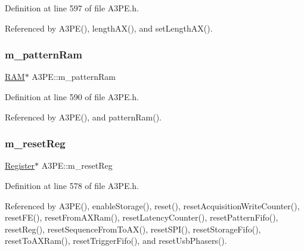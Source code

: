 Definition at line 597 of file A3\+P\+E.\+h.



Referenced by A3\+P\+E(), length\+A\+X(), and set\+Length\+A\+X().

\mbox{\label{classA3PE_a84d5deabbbf2d513144dd6a00390182e}} 
\subsubsection{\texorpdfstring{m\+\_\+pattern\+Ram}{m\_patternRam}}
{\footnotesize\ttfamily \hyperlink{classRAM}{R\+AM}$\ast$ A3\+P\+E\+::m\+\_\+pattern\+Ram\hspace{0.3cm}{\ttfamily [private]}}



Definition at line 590 of file A3\+P\+E.\+h.



Referenced by A3\+P\+E(), and pattern\+Ram().

\mbox{\label{classA3PE_ab4db5f00976e5095686f108c8febf702}} 
\subsubsection{\texorpdfstring{m\+\_\+reset\+Reg}{m\_resetReg}}
{\footnotesize\ttfamily \hyperlink{classRegister}{Register}$\ast$ A3\+P\+E\+::m\+\_\+reset\+Reg\hspace{0.3cm}{\ttfamily [private]}}



Definition at line 578 of file A3\+P\+E.\+h.



Referenced by A3\+P\+E(), enable\+Storage(), reset(), reset\+Acquisition\+Write\+Counter(), reset\+F\+E(), reset\+From\+A\+X\+Ram(), reset\+Latency\+Counter(), reset\+Pattern\+Fifo(), reset\+Reg(), reset\+Sequence\+From\+To\+A\+X(), reset\+S\+P\+I(), reset\+Storage\+Fifo(), reset\+To\+A\+X\+Ram(), reset\+Trigger\+Fifo(), and reset\+Usb\+Phasers().

\mbox{\label{classA3PE_a142fa10b7e705c4701ae21678ec2ec8a}} 
